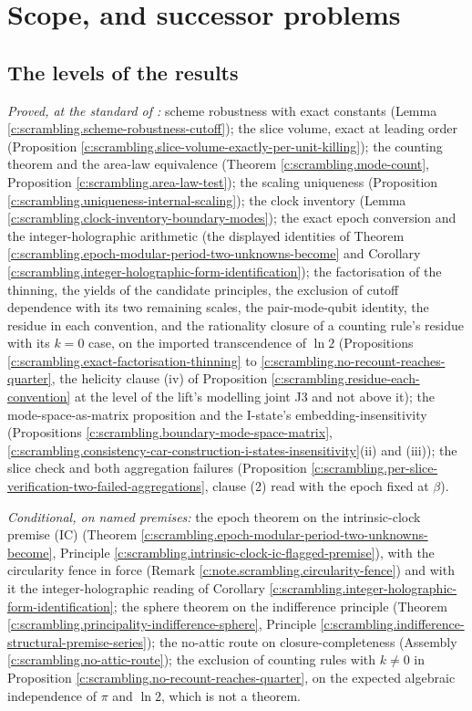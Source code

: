 \documentclass[11pt]{article}
\theoremstyle{definition}
\theoremstyle{plain}
\begin{document}
\section{Scope, and successor problems}

\subsection*{The levels of the results}
\label{c:note.scrambling.setting-levels-results}
\emph{Proved, at the standard of \cite{ButlerT1}:} scheme robustness with exact constants (Lemma \ref{c:scrambling.scheme-robustness-cutoff}); the slice volume, exact at leading order (Proposition \ref{c:scrambling.slice-volume-exactly-per-unit-killing}); the counting theorem and the area-law equivalence (Theorem \ref{c:scrambling.mode-count}, Proposition \ref{c:scrambling.area-law-test}); the scaling uniqueness (Proposition \ref{c:scrambling.uniqueness-internal-scaling}); the clock inventory (Lemma \ref{c:scrambling.clock-inventory-boundary-modes}); the exact epoch conversion and the integer-holographic arithmetic (the displayed identities of Theorem \ref{c:scrambling.epoch-modular-period-two-unknowns-become} and Corollary \ref{c:scrambling.integer-holographic-form-identification}); the factorisation of the thinning, the yields of the candidate principles, the exclusion of cutoff dependence with its two remaining scales, the pair-mode-qubit identity, the residue in each convention, and the rationality closure of a counting rule's residue with its $k = 0$ case, on the imported transcendence of $\ln 2$ (Propositions \ref{c:scrambling.exact-factorisation-thinning} to \ref{c:scrambling.no-recount-reaches-quarter}, the helicity clause (iv) of Proposition \ref{c:scrambling.residue-each-convention} at the level of the lift's modelling joint J3 and not above it); the mode-space-as-matrix proposition and the I-state's embedding-insensitivity (Propositions \ref{c:scrambling.boundary-mode-space-matrix}, \ref{c:scrambling.consistency-car-construction-i-states-insensitivity}(ii) and (iii)); the slice check and both aggregation failures (Proposition \ref{c:scrambling.per-slice-verification-two-failed-aggregations}, clause (2) read with the epoch fixed at $\beta$).

\emph{Conditional, on named premises:} the epoch theorem on the intrinsic-clock premise (IC) (Theorem \ref{c:scrambling.epoch-modular-period-two-unknowns-become}, Principle \ref{c:scrambling.intrinsic-clock-ic-flagged-premise}), with the circularity fence in force (Remark \ref{c:note.scrambling.circularity-fence}) and with it the integer-holographic reading of Corollary \ref{c:scrambling.integer-holographic-form-identification}; the sphere theorem on the indifference principle (Theorem \ref{c:scrambling.principality-indifference-sphere}, Principle \ref{c:scrambling.indifference-structural-premise-series}); the no-attic route on closure-completeness (Assembly \ref{c:scrambling.no-attic-route}); the exclusion of counting rules with $k \neq 0$ in Proposition \ref{c:scrambling.no-recount-reaches-quarter}, on the expected algebraic independence of $\pi$ and $\ln 2$, which is not a theorem.
\end{document}
